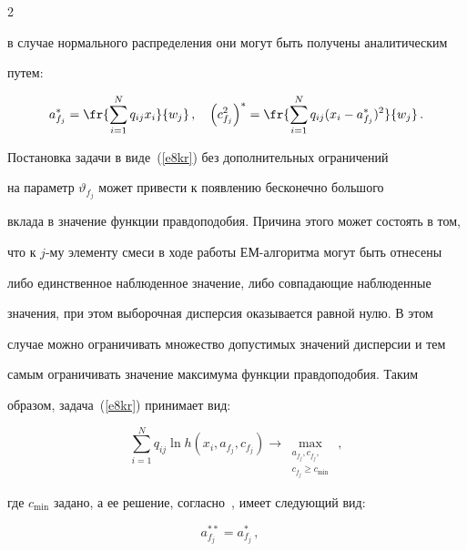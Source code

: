\begin{multicols}{2}
\begin{equation}
\label{e8kr}


\end{equation}


в случае нормального распределения они могут быть получены аналитическим 


путем:


\begin{equation*}


a^*_{f_j} = \fr{\sum\limits_{i=1}^N q_{ij} x_i}{w_j}\,,\quad \left ( c^2_{f_j}\right )^* 


= \fr{\sum\limits_{i=1}^N q_{ij} (x_i -a^*_{f_j})^2}{w_j}\,.


\end{equation*}


     


     Постановка задачи в виде~(\ref{e8kr}) без дополнительных ограничений 


на параметр $\vartheta_{f_j}$ может привести к появлению бесконечно большого 


вклада в значение функции правдоподобия. Причина этого может состоять в том, 


что к $j$-му элементу смеси в ходе работы ЕМ-алгоритма могут быть отнесены 


либо единственное наблюденное значение, либо совпадающие наблюденные 


значения, при этом выборочная дисперсия оказывается равной нулю. В этом 


случае можно ограничивать множество допустимых значений дисперсии и тем 


самым ограничивать значение максимума функции правдоподобия. Таким 


образом, задача~(\ref{e8kr}) принимает вид:


     \begin{equation*}


     \sum\limits_{i=1}^N q_{ij}\ln h(x_i,a_{f_j},c_{f_j})\rightarrow


     \underset{\substack{{a_{f_j}, c_{f_j},}\\{c_{f_j}\geq c_{\min}}}}{\max}\,,


     \end{equation*}


где $c_{\min}$ задано, а ее решение, согласно~\cite{1kr}, имеет следующий вид:


\begin{equation*}


a_{f_j}^{**}=a_{f_j}^*\,,\quad



\end{equation*}
\end{multicols}
